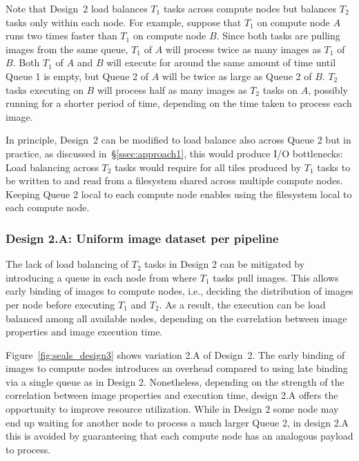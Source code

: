 Note that Design~2 load balances $T_{1}$ tasks across compute nodes but 
balances $T_{2}$ tasks only within each node. For example, suppose that
$T_{1}$ on compute node $A$ runs two times faster than $T_{1}$ on compute
node $B$. Since both tasks are pulling images from the same queue, $T_{1}$ of
$A$ will process twice as many images as $T_{1}$ of $B$. Both $T_{1}$ of $A$
and $B$ will execute for around the same amount of time until Queue 1 is
empty, but Queue 2 of $A$ will be twice as large as Queue 2 of $B$. $T_{2}$
tasks executing on $B$ will process half as many images as $T_{2}$ tasks on
$A$, possibly running for a shorter period of time, depending on the
time taken to process each image.

In principle, Design~2 can be modified to load balance also across Queue 2
but in practice, as discussed in~\S\ref{ssec:approach1}, this would produce
I/O bottlenecks: Load balancing across $T_{2}$ tasks would require for all
tiles produced by $T_{1}$ tasks to be written to and read  from a filesystem
shared across multiple compute nodes. Keeping Queue 2 local to each compute
node enables using the filesystem local to each compute node.

\subsubsection{Design 2.A: Uniform image dataset per pipeline}
\label{sssec:approach2a}

The lack of load balancing of $T_{2}$ tasks in Design 2 can be mitigated by
introducing a queue in each node from where $T_{1}$ tasks pull images. This
allows early binding of images to compute nodes, i.e., deciding the
distribution of images per node before executing $T_{1}$ and $T_{2}$. As a
result, the execution can be load balanced among all available nodes,
depending on the correlation between image properties and image execution
time.

Figure~\ref{fig:seals_design3} shows variation 2.A of Design~2. The early
binding of images to compute nodes introduces an overhead compared to using
late binding via a single queue as in Design 2. Nonetheless, depending on the
strength of the correlation between image properties and execution time,
design 2.A offers the opportunity to improve resource utilization. While in
Design 2 some node may end up waiting for another node to process a much
larger Queue 2, in design 2.A this is avoided by guaranteeing that each
compute node has an analogous payload to process.


